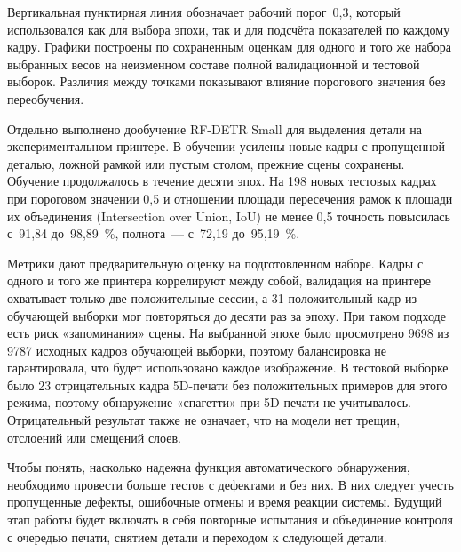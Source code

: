 Вертикальная пунктирная линия обозначает рабочий порог~0,3, который использовался как для выбора эпохи, так и для подсчёта показателей по каждому кадру. Графики построены по сохраненным оценкам для одного и того же набора выбранных весов на неизменном составе полной валидационной и тестовой выборок. Различия между точками показывают влияние порогового значения без переобучения.

Отдельно выполнено дообучение RF-DETR Small для выделения детали на экспериментальном принтере. В обучении усилены новые кадры с пропущенной деталью, ложной рамкой или пустым столом, прежние сцены сохранены. Обучение продолжалось в течение десяти эпох.  На 198 новых тестовых кадрах при пороговом значении 0,5 и отношении площади пересечения рамок к площади их объединения (Intersection over Union, IoU) не менее 0,5 точность повысилась с~91,84 до~98,89~\%, полнота~--- с~72,19 до~95,19~\%.

Метрики дают предварительную оценку на подготовленном наборе. Кадры с одного и того же принтера коррелируют между собой, валидация на принтере охватывает только две положительные сессии, а 31 положительный кадр из обучающей выборки мог повторяться до десяти раз за эпоху. При таком подходе есть риск «запоминания» сцены. На выбранной эпохе было просмотрено 9698 из 9787 исходных кадров обучающей выборки, поэтому балансировка не гарантировала, что будет использовано каждое изображение. В тестовой выборке было 23 отрицательных кадра 5D-печати без положительных примеров для этого режима, поэтому обнаружение «спагетти» при 5D-печати не учитывалось. Отрицательный результат также не означает, что на модели нет трещин, отслоений или смещений слоев.

Чтобы понять, насколько надежна функция автоматического обнаружения, необходимо провести больше тестов с дефектами и без них. В них следует учесть пропущенные дефекты, ошибочные отмены и время реакции системы. Будущий этап работы будет включать в себя повторные испытания и объединение контроля с очередью печати, снятием детали и переходом к следующей детали.

